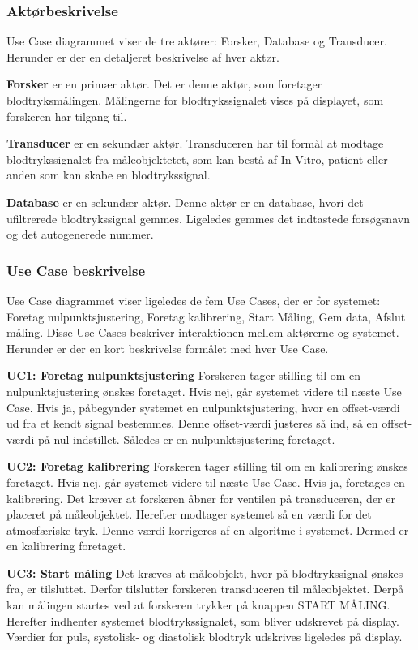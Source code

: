 \subsubsection{Aktørbeskrivelse}
Use Case diagrammet viser de tre aktører: Forsker, Database og Transducer. Herunder er der en detaljeret beskrivelse af hver aktør.

\textbf{Forsker} er en primær aktør. Det er denne aktør, som foretager blodtryksmålingen. Målingerne for blodtrykssignalet vises på displayet, som forskeren har tilgang til. 

\textbf{Transducer} er en sekundær aktør. Transduceren har til formål at modtage blodtrykssignalet fra måleobjektetet, som kan bestå af In Vitro, patient eller anden som kan skabe en blodtrykssignal. 

\textbf{Database} er en sekundær aktør. Denne aktør er en database, hvori det ufiltrerede blodtrykssignal gemmes. Ligeledes gemmes det indtastede forsøgsnavn og det autogenerede nummer.

\subsubsection{Use Case beskrivelse}
Use Case diagrammet viser ligeledes de fem Use Cases, der er for systemet: Foretag nulpunktsjustering, Foretag kalibrering, Start Måling, Gem data, Afslut måling. Disse Use Cases beskriver interaktionen mellem aktørerne og systemet. Herunder er der en kort beskrivelse formålet med hver Use Case.

\textbf{UC1: Foretag nulpunktsjustering}
Forskeren tager stilling til om en nulpunktsjustering ønskes foretaget. Hvis nej, går systemet videre til næste Use Case. Hvis ja, påbegynder systemet en nulpunktsjustering, hvor en offset-værdi ud fra et kendt signal bestemmes. Denne offset-værdi justeres så ind, så en offset-værdi på nul indstillet. Således er en nulpunktsjustering foretaget.

\textbf{UC2: Foretag kalibrering}
Forskeren tager stilling til om en kalibrering ønskes foretaget. Hvis nej, går systemet videre til næste Use Case. Hvis ja, foretages en kalibrering. Det kræver at forskeren åbner for ventilen på transduceren, der er placeret på måleobjektet. Herefter modtager systemet så en værdi for det atmosfæriske tryk. Denne værdi korrigeres af en algoritme i systemet. Dermed er en kalibrering foretaget.  

\textbf{UC3: Start måling}
Det kræves at måleobjekt, hvor på blodtrykssignal ønskes fra, er tilsluttet. Derfor tilslutter forskeren transduceren til måleobjektet. Derpå kan målingen startes ved at forskeren trykker på knappen START MÅLING. Herefter indhenter systemet blodtrykssignalet, som bliver udskrevet på display. Værdier for puls, systolisk- og diastolisk blodtryk udskrives ligeledes på display. 

